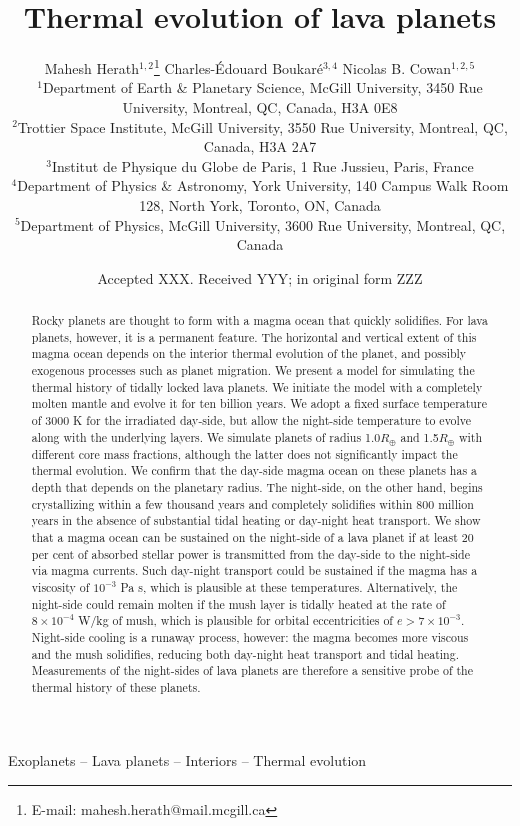 \documentclass[fleqn,usenatbib]{mnras}
\title[Thermal evolution of lava planets]{Thermal evolution of lava planets}
\author[Herath et al.]{
Mahesh Herath$^{1,2}$\thanks{E-mail: mahesh.herath@mail.mcgill.ca}
Charles-\'Edouard Boukar\'e$^{3,4}$
Nicolas B. Cowan$^{1,2,5}$
\\
$^{1}$Department of Earth \& Planetary Science, McGill University, 3450 Rue University, Montreal, QC, Canada, H3A 0E8 \\
$^{2}$Trottier Space Institute, McGill University, 3550 Rue University, Montreal, QC, Canada, H3A 2A7 \\
$^{3}$Institut de Physique du Globe de Paris, 1 Rue Jussieu, Paris, France\\
$^{4}$Department of Physics \& Astronomy, York University, 140 Campus Walk Room 128, North York, Toronto, ON, Canada\\
$^{5}$Department of Physics, McGill University, 3600 Rue University, Montreal, QC, Canada\\
}
\date{Accepted XXX. Received YYY; in original form ZZZ}
\begin{document}
\label{firstpage}
\pagerange{\pageref{firstpage}--\pageref{lastpage}}
\maketitle

\begin{abstract}
Rocky planets are thought to form with a magma ocean that quickly solidifies. For lava planets, however, it is a permanent feature. The horizontal and vertical extent of this magma ocean depends on the interior thermal evolution of the planet, and possibly exogenous processes such as planet migration. We present a model for simulating the thermal history of tidally locked lava planets. We initiate the model with a completely molten mantle and evolve it for ten billion years. We adopt a fixed surface temperature of 3000 K for the irradiated day-side, but allow the night-side temperature to evolve along with the underlying layers. We simulate planets of radius 1.0$R_{\oplus}$ and 1.5$R_{\oplus}$ with different core mass fractions, although the latter does not significantly impact the thermal evolution. We confirm that the day-side magma ocean on these planets has a depth that depends on the planetary radius. The night-side, on the other hand, begins crystallizing within a few thousand years and completely solidifies within 800 million years in the absence of substantial tidal heating or day-night heat transport. We show that a magma ocean can be sustained on the night-side of a lava planet if at least 20 per cent of absorbed stellar power is transmitted from the day-side to the night-side via magma currents. Such day-night transport could be sustained if the magma has a viscosity of $10^{-3}$ Pa s, which is plausible at these temperatures. Alternatively, the night-side could remain molten if the mush layer is tidally heated at the rate of $8 \times 10^{-4}$ W/kg of mush, which is plausible for orbital eccentricities of $e > 7 \times 10^{-3}$. Night-side cooling is a runaway process, however: the magma becomes more viscous and the mush solidifies, reducing both day-night heat transport and tidal heating. Measurements of the night-sides of lava planets are therefore a sensitive probe of the thermal history of these planets. 
\end{abstract}

\begin{keywords}
Exoplanets -- Lava planets -- Interiors -- Thermal evolution
\end{keywords}
\end{document}

